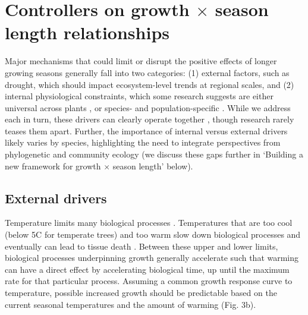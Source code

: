 \documentclass[11pt]{article}
\begin{document}
\section*{Controllers on growth $\times$ season length relationships} %
Major mechanisms that could limit or disrupt the positive effects of longer growing seasons generally fall into two categories: (1) external factors, such as drought, which should impact ecosystem-level trends at regional scales, and (2) internal physiological constraints, which some research suggests are either universal across plants \citep[e.g.][]{zohner2023effect}, or species- and population-specific \citep[e.g.][]{soolanayakanahally2013timing}. While we address each in turn, these drivers can clearly operate together \citep[][]{korner2015paradigm}, though research rarely teases them apart. Further, the importance of internal versus external drivers likely varies by species, highlighting the need to integrate perspectives from  phylogenetic and community ecology (we discuss these gaps further in `Building a new framework for growth $\times$ season length' below). 

\subsection*{External drivers}
Temperature limits many biological processes \citep{korner2015paradigm}. Temperatures that are too cool (below 5\degree C for temperate trees) and too warm \citep[an area of active research, but likely between 35-45\degree C;][]{martinez2008hot,cabon2022cross} slow down biological processes and eventually can lead to tissue death \citep[see Fig. 3a, Box,][]{larcher1980,kramer2012book}. Between these upper and lower limits, biological processes underpinning growth generally accelerate such that warming can have a direct effect by accelerating biological time, up until the maximum rate for that particular process. Assuming a common growth response curve to temperature, possible increased growth should be predictable based on the current seasonal temperatures and the amount of warming (Fig. 3b). 
\end{document}

